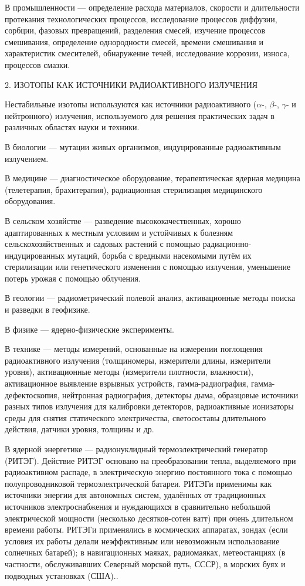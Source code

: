 \documentclass[a5paper,openany]{book}
\begin{document}
В промышленности — определение расхода материалов, скорости и длительности протекания технологических процессов, исследование процессов диффузии, сорбции, фазовых превращений, разделения смесей, изучение процессов смешивания, определение однородности смесей, времени смешивания и характеристик смесителей, обнаружение течей, исследование коррозии, износа, процессов смазки.

2. ИЗОТОПЫ КАК ИСТОЧНИКИ РАДИОАКТИВНОГО ИЗЛУЧЕНИЯ

Нестабильные изотопы используются как источники радиоактивного ($\alpha$-, $\beta$-, $\gamma$- и нейтронного) излучения, используемого для решения практических задач в различных областях науки и техники.

В биологии --- мутации живых организмов, индуцированные радиоактивным излучением.

В медицине --- диагностическое оборудование, терапевтическая ядерная медицина (телетерапия, брахитерапия), радиационная стерилизация медицинского оборудования.

В сельском хозяйстве --- разведение высококачественных, хорошо адаптированных к местным условиям и устойчивых к болезням сельскохозяйственных и садовых растений с помощью радиационно-индуцированных мутаций, борьба с вредными насекомыми путём их стерилизации или генетического изменения с помощью излучения, уменьшение потерь урожая с помощью облучения.

В геологии --- радиометрический полевой анализ, активационные методы поиска и разведки в геофизике.

В физике --- ядерно-физические эксперименты.

В технике --- методы измерений, основанные на измерении поглощения радиоактивного излучения (толщиномеры, измерители длины, измерители уровня), активационные методы (измерители плотности, влажности), активационное выявление взрывных устройств, гамма-радиография, гамма-дефектоскопия, нейтронная радиография, детекторы дыма, образцовые источники разных типов излучения для калибровки детекторов, радиоактивные ионизаторы среды для снятия статического электричества, светосоставы длительного действия, датчики уровня, толщины и др.

В ядерной энергетике --- радионуклидный термоэлектрический генератор (РИТЭГ). Действие РИТЭГ основано на преобразовании тепла, выделяемого при радиоактивном распаде, в электрическую энергию постоянного тока с помощью полупроводниковой термоэлектрической батареи. РИТЭГи применимы как источники энергии для автономных систем, удалённых от традиционных источников электроснабжения и нуждающихся в сравнительно небольшой электрической мощности (несколько десятков-сотен ватт) при очень длительном времени работы. РИТЭГи применялись в космических аппаратах, зондах (если условия их работы делали  неэффективным или невозможным использование солнечных батарей);  в навигационных маяках, радиомаяках, метеостанциях (в частности, обслуживавших Северный морской путь, СССР), в морских буях и подводных установках (США)..
\end{document}
